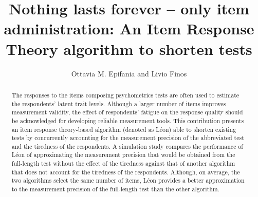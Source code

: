 \documentclass{svproc}
\begin{document}
\mainmatter              %
%
\title{Nothing lasts forever -- only item administration: An Item Response Theory algorithm to shorten tests}
%
%
\author{Ottavia M. Epifania and Livio Finos}
%
%
%

\maketitle              %

\begin{abstract} 
The responses to the items composing psychometrics tests are often used to estimate the respondents' latent trait levels.
Although a larger number of items improves measurement validity, the effect of respondents’ fatigue on the response quality should be acknowledged for developing reliable measurement tools.  This contribution presents an item response theory-based algorithm (denoted as Léon) able to shorten existing tests by concurrently accounting for the measurement precision of the abbreviated test and the tiredness of the respondents. A simulation study compares the performance of Léon of approximating the measurement precision that would be obtained from the full-length test without the effect of the tiredness against that of another algorithm that does not account for the tiredness of the respondents. Although, on average, the two algorithms select the same number of items, Léon provides a better approximation to the measurement precision of the full-length test than the other algorithm.  
\end{abstract}
%
\end{document}
